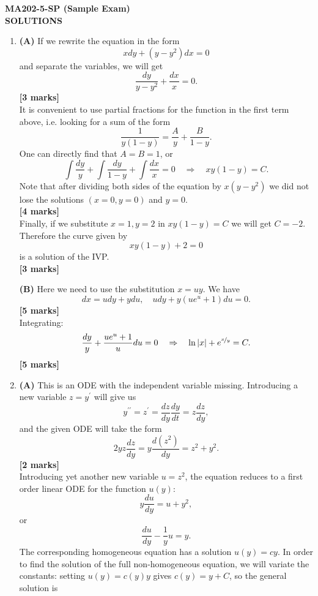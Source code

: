 \documentclass[11pt,a4paper]{article}
\begin{document}
\begin{center}
		\textbf{MA202-5-SP (Sample Exam)}\\
		\textbf{SOLUTIONS}
\end{center}
%
\begin{enumerate}
		\item \textbf{(A)} If we rewrite the equation in the form
		$$
		xdy + (y-y^2)dx = 0
		$$
		and separate the variables, we will get
		$$
		\frac{dy}{y-y^2} + \frac{dx}{x} = 0.
		$$
		\hfill\textbf{[3 marks]}\\
		It is convenient to use partial fractions for the function in the first term above, i.e. looking for a sum of the form
		$$
		\frac{1}{y(1-y)} = \frac{A}{y} + \frac{B}{1-y}.
		$$
		One can directly find that $A = B = 1$, or
		$$
		\int \frac{dy}{y} + \int \frac{dy}{1-y} + \int \frac{dx}{x} = 0\quad \Rightarrow\quad xy(1-y) = C.
		$$
		Note that after dividing both sides of the equation by $x(y − y^2)$ we did not lose the solutions $(x = 0, y = 0)$ and $y = 0$.\\
		\hspace*{0pt}\hfill\textbf{[4 marks]}\\
		Finally, if we substitute $x = 1, y = 2$ in $xy(1 - y) = C$ we will get $C = -2$. Therefore the curve given by
		$$
		xy(1-y) + 2 = 0
		$$
		is a solution of the IVP.\\
		\hspace*{0pt}\hfill\textbf{[3 marks]}\par
		\textbf{(B)} Here we need to use the substitution $x = uy$. We have
		$$
		dx = udy + ydu,\quad udy+y(ue^u + 1)du = 0.
		$$
		\hfill\textbf{[5 marks]}\\
		Integrating:
		$$
		\frac{dy}{y} + \frac{ue^u + 1}{u}du = 0\quad \Rightarrow\quad \ln|x| + e^{\nicefrac{x}{y}} = C.
		$$
		\hfill\textbf{[5 marks]}
		\item \textbf{(A)} This is an ODE with the independent variable missing. Introducing a new variable $z = y^\prime$ will give us
		$$
		y^{\prime\prime} = z^\prime = \frac{dz}{dy}\frac{dy}{dt} = z\frac{dz}{dy},
		$$
		and the given ODE will take the form
		$$
		2yz\frac{dz}{dy} = y\frac{d(z^2)}{dy} = z^2 + y^2.
		$$
		\hfill\textbf{[2 marks]}\\
		Introducing yet another new variable $u = z^2$, the equation reduces to a first order linear ODE for the function $u(y)$:
		$$
		y\frac{du}{dy} = u+y^2,
		$$
		or
		$$
		\frac{du}{dy} - \frac{1}{y}u = y.
		$$
		The corresponding homogeneous equation has a solution $u(y) = cy$. In order to find the solution of the full non-homogeneous equation, we will variate the constants: setting $u(y) = c(y)y$ gives $c(y) = y + C$, so the general solution is

\end{enumerate}
\end{document}
